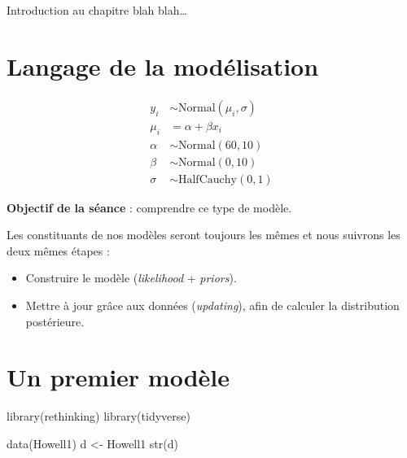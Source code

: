 \documentclass[
  a4paper,11pt,twoside,onecolumn,openright,final,oldfontcommands]{memoir}
\newenvironment{Shaded}{\begin{snugshade}}{\end{snugshade}}
\newcommand{\FunctionTok}[1]{\textcolor[rgb]{0.00,0.00,0.00}{#1}}
\newcommand{\NormalTok}[1]{#1}
\newcommand{\OtherTok}[1]{\textcolor[rgb]{0.56,0.35,0.01}{#1}}
\providecommand{\tightlist}{%
  \setlength{\itemsep}{0pt}\setlength{\parskip}{0pt}}
\theoremstyle{definition}
\theoremstyle{definition}
\theoremstyle{definition}
\theoremstyle{remark}
\begin{document}

Introduction au chapitre blah blah\ldots{}

\hypertarget{langage-de-la-moduxe9lisation}{%
\section{Langage de la modélisation}\label{langage-de-la-moduxe9lisation}}

\[
\begin{aligned}
y_{i} &\sim \mathrm{Normal}(\mu_{i}, \sigma) \\
\mu_{i}&= \alpha + \beta x_{i} \\
\alpha &\sim \mathrm{Normal}(60, 10) \\
\beta &\sim \mathrm{Normal}(0, 10) \\
\sigma &\sim \mathrm{HalfCauchy}(0, 1)
\end{aligned}
\]

\textbf{Objectif de la séance} : comprendre ce type de modèle.

Les constituants de nos modèles seront toujours les mêmes et nous suivrons les deux mêmes étapes :

\begin{itemize}
\tightlist
\item
  Construire le modèle (\emph{likelihood} + \emph{priors}).
\item
  Mettre à jour grâce aux données (\emph{updating}), afin de calculer la distribution postérieure.
\end{itemize}

\hypertarget{un-premier-moduxe8le}{%
\section{Un premier modèle}\label{un-premier-moduxe8le}}

\begin{Shaded}
\begin{Highlighting}[]
\FunctionTok{library}\NormalTok{(rethinking)}
\FunctionTok{library}\NormalTok{(tidyverse)}

\FunctionTok{data}\NormalTok{(Howell1)}
\NormalTok{d }\OtherTok{\textless{}{-}}\NormalTok{ Howell1}
\FunctionTok{str}\NormalTok{(d)}
\end{Highlighting}
\end{Shaded}
\end{document}

